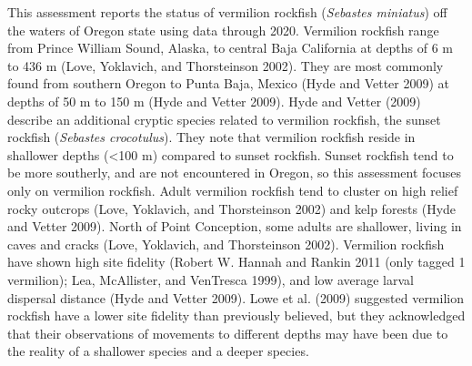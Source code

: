 \documentclass[11pt,
  english,
  a4paper,
]{article}
\begin{document}
This assessment reports the status of vermilion rockfish (\emph{Sebastes miniatus}) off the waters of Oregon state using data through 2020. Vermilion rockfish range from Prince William Sound, Alaska, to central Baja California at depths of 6 m to 436 m {(Love, Yoklavich, and Thorsteinson 2002)\leavevmode\tagmcend\tagstructend}. They are most commonly found from southern Oregon to Punta Baja, Mexico {(Hyde and Vetter 2009)\leavevmode\tagmcend\tagstructend} at depths of 50 m to 150 m {(Hyde and Vetter 2009)\leavevmode\tagmcend\tagstructend}. Hyde and Vetter {(2009)\leavevmode\tagmcend\tagstructend} describe an additional cryptic species related to vermilion rockfish, the sunset rockfish (\emph{Sebastes crocotulus}). They note that vermilion rockfish reside in shallower depths (\textless100 m) compared to sunset rockfish. Sunset rockfish tend to be more southerly, and are not encountered in Oregon, so this assessment focuses only on vermilion rockfish. Adult vermilion rockfish tend to cluster on high relief rocky outcrops {(Love, Yoklavich, and Thorsteinson 2002)\leavevmode\tagmcend\tagstructend} and kelp forests {(Hyde and Vetter 2009)\leavevmode\tagmcend\tagstructend}. North of Point Conception, some adults are shallower, living in caves and cracks {(Love, Yoklavich, and Thorsteinson 2002)\leavevmode\tagmcend\tagstructend}. Vermilion rockfish have shown high site fidelity {(Robert W. Hannah and Rankin 2011 (only tagged 1 vermilion); Lea, McAllister, and VenTresca 1999)\leavevmode\tagmcend\tagstructend}, and low average larval dispersal distance {(Hyde and Vetter 2009)\leavevmode\tagmcend\tagstructend}. Lowe et al. {(2009)\leavevmode\tagmcend\tagstructend} suggested vermilion rockfish have a lower site fidelity than previously believed, but they acknowledged that their observations of movements to different depths may have been due to the reality of a shallower species and a deeper species.

\leavevmode\tagmcend\tagstructend\par
\end{document}
